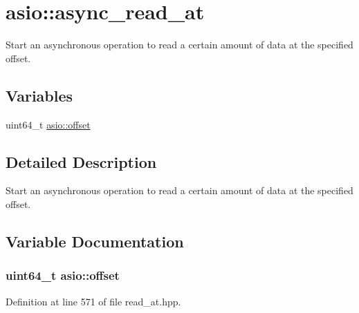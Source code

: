 \hypertarget{group__async__read__at}{}\section{asio\+:\+:async\+\_\+read\+\_\+at}
\label{group__async__read__at}


Start an asynchronous operation to read a certain amount of data at the specified offset.  


\subsection*{Variables}
\begin{DoxyCompactItemize}
\item 
uint64\+\_\+t \hyperlink{group__async__read__at_ga8dcdb41a4adfd6fe5322b5dd666d9f29}{asio\+::offset}
\end{DoxyCompactItemize}


\subsection{Detailed Description}
Start an asynchronous operation to read a certain amount of data at the specified offset. 



\subsection{Variable Documentation}
\hypertarget{group__async__read__at_ga8dcdb41a4adfd6fe5322b5dd666d9f29}{}
\subsubsection[{offset}]{\setlength{\rightskip}{0pt plus 5cm}uint64\+\_\+t asio\+::offset}\label{group__async__read__at_ga8dcdb41a4adfd6fe5322b5dd666d9f29}


Definition at line 571 of file read\+\_\+at.\+hpp.

